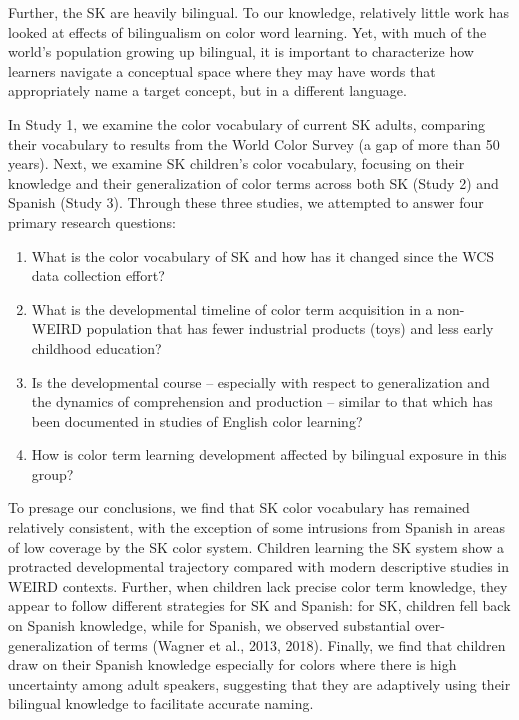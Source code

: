 \documentclass[
  english,
  ,apa7,floatsintext]{apa6}
\providecommand{\tightlist}{%
  \setlength{\itemsep}{0pt}\setlength{\parskip}{0pt}}
\begin{document}
Further, the SK are heavily bilingual. To our knowledge, relatively little work has looked at effects of bilingualism on color word learning. Yet, with much of the world's population growing up bilingual, it is important to characterize how learners navigate a conceptual space where they may have words that appropriately name a target concept, but in a different language.

In Study 1, we examine the color vocabulary of current SK adults, comparing their vocabulary to results from the World Color Survey (a gap of more than 50 years). Next, we examine SK children's color vocabulary, focusing on their knowledge and their generalization of color terms across both SK (Study 2) and Spanish (Study 3). Through these three studies, we attempted to answer four primary research questions:

\begin{enumerate}
\def\labelenumi{\arabic{enumi}.}
\tightlist
\item
  What is the color vocabulary of SK and how has it changed since the WCS data collection effort?
\item
  What is the developmental timeline of color term acquisition in a non-WEIRD population that has fewer industrial products (toys) and less early childhood education?
\item
  Is the developmental course -- especially with respect to generalization and the dynamics of comprehension and production -- similar to that which has been documented in studies of English color learning?
\item
  How is color term learning development affected by bilingual exposure in this group?
\end{enumerate}

To presage our conclusions, we find that SK color vocabulary has remained relatively consistent, with the exception of some intrusions from Spanish in areas of low coverage by the SK color system. Children learning the SK system show a protracted developmental trajectory compared with modern descriptive studies in WEIRD contexts. Further, when children lack precise color term knowledge, they appear to follow different strategies for SK and Spanish: for SK, children fell back on Spanish knowledge, while for Spanish, we observed substantial over-generalization of terms (Wagner et al., 2013, 2018). Finally, we find that children draw on their Spanish knowledge especially for colors where there is high uncertainty among adult speakers, suggesting that they are adaptively using their bilingual knowledge to facilitate accurate naming.
\end{document}
